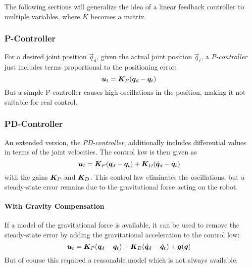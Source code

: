 			The following sections will generalize the idea of a linear feedback controller to multiple variables, where \(K\) becomes a matrix.

			\subsubsection{P-Controller}
				For a desired joint position \(\vec{q}_d\), given the actual joint position \(\vec{q}_t\), a \emph{P-controller} just includes terms proportional to the positioning error:
				\begin{equation*}
					\bm{u}_t = \bm{K}_P (\bm{q}_d - \bm{q}_t)
				\end{equation*}
				But a simple P-controller causes high oscillations in the position, making it not suitable for real control.

			\subsubsection{PD-Controller}
				An extended version, the \emph{PD-controller}, additionally includes differential values in terms of the joint velocities. The control law is then given as
				\begin{equation*}
					\bm{u}_t = \bm{K}_P (\bm{q}_d - \bm{q}_t) + \bm{K}_D (\dot{\bm{q}}_d - \dot{\bm{q}}_t)
				\end{equation*}
				with the gains \( \bm{K}_P \) and \( \bm{K}_D \). This control law eliminates the oscillations, but a steady-state error remains due to the gravitational force acting on the robot.

				\paragraph{With Gravity Compensation}
					If a model of the gravitational force is available, it can be used to remove the steady-state error by adding the gravitational acceleration to the control low:
					\begin{equation*}
						\bm{u}_t = \bm{K}_P (\bm{q}_d - \bm{q}_t) + \bm{K}_D (\dot{\bm{q}}_d - \dot{\bm{q}}_t) + \bm{g}(\bm{q})
					\end{equation*}
					But of course this required a reasonable model which is not always available.

